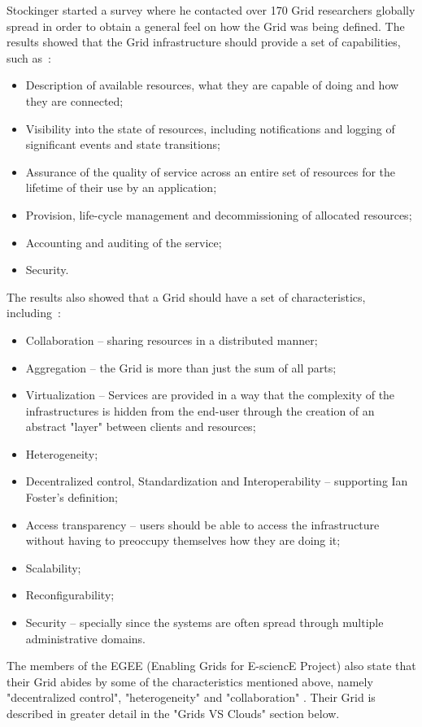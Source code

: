 Stockinger started a survey where he contacted over 170 Grid researchers globally spread in order to obtain a general feel on how the Grid was being defined. The results showed that the Grid infrastructure should provide a set of capabilities, such as~\cite{stockinger}:
\begin{itemize}
\item Description of available resources, what they are capable of doing and how they are connected;
\item Visibility into the state of resources, including notifications and logging of significant events  and state transitions;
\item Assurance of the quality of service across an entire set of resources for the lifetime of their use by an application;
\item Provision, life-cycle management and decommissioning of allocated resources;
\item Accounting and auditing of the service;
\item Security.
\end{itemize}

The results also showed that a Grid should have a set of characteristics, including~\cite{stockinger}:
\begin{itemize}
\item Collaboration -- sharing resources in a distributed manner;
\item Aggregation -- the Grid is more than just the sum of all parts;
\item Virtualization -- Services are provided in a way that the complexity of the infrastructures is hidden from the end-user through the creation of an abstract "layer" between clients and resources;
\item Heterogeneity;
\item Decentralized control, Standardization and Interoperability -- supporting Ian Foster's definition;
\item Access transparency -- users should be able to access the infrastructure without having to preoccupy themselves how they are doing it;
\item Scalability; 
\item Reconfigurability;
\item Security -- specially since the systems are often spread through multiple administrative domains. 
\end{itemize}

The members of the EGEE (Enabling Grids for E-sciencE Project) also state that their Grid abides by some of the characteristics mentioned above, namely "decentralized control", "heterogeneity" and "collaboration" \cite{grids-and-clouds}. Their Grid is described in greater detail in the "Grids VS Clouds" section below. 

